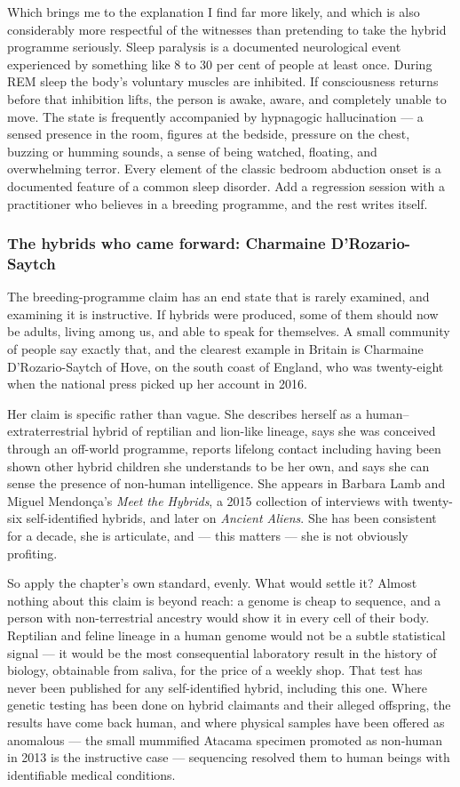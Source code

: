 Which brings me to the explanation I find far more likely, and which is also considerably more
respectful of the witnesses than pretending to take the hybrid programme seriously. Sleep
paralysis is a documented neurological event experienced by something like 8 to 30 per cent of
people at least once. During REM sleep the body's voluntary muscles are inhibited. If
consciousness returns before that inhibition lifts, the person is awake, aware, and completely
unable to move. The state is frequently accompanied by hypnagogic hallucination --- a sensed
presence in the room, figures at the bedside, pressure on the chest, buzzing or humming
sounds, a sense of being watched, floating, and overwhelming terror. Every element of the
classic bedroom abduction onset is a documented feature of a common sleep disorder. Add a
regression session with a practitioner who believes in a breeding programme, and the rest
writes itself.

\subsubsection*{The hybrids who came forward: Charmaine D'Rozario-Saytch}

The breeding-programme claim has an end state that is rarely examined, and examining it is
instructive. If hybrids were produced, some of them should now be adults, living among us, and
able to speak for themselves. A small community of people say exactly that, and the clearest
example in Britain is Charmaine D'Rozario-Saytch of Hove, on the south coast of England, who was
twenty-eight when the national press picked up her account in 2016.

Her claim is specific rather than vague. She describes herself as a human--extraterrestrial
hybrid of reptilian and lion-like lineage, says she was conceived through an off-world programme,
reports lifelong contact including having been shown other hybrid children she understands to be
her own, and says she can sense the presence of non-human intelligence. She appears in Barbara
Lamb and Miguel Mendon\c{c}a's \emph{Meet the Hybrids}, a 2015 collection of interviews with
twenty-six self-identified hybrids, and later on \emph{Ancient Aliens}. She has been consistent
for a decade, she is articulate, and --- this matters --- she is not obviously profiting.

So apply the chapter's own standard, evenly. What would settle it? Almost nothing about this
claim is beyond reach: a genome is cheap to sequence, and a person with non-terrestrial ancestry
would show it in every cell of their body. Reptilian and feline lineage in a human genome would
not be a subtle statistical signal --- it would be the most consequential laboratory result in
the history of biology, obtainable from saliva, for the price of a weekly shop. That test has
never been published for any self-identified hybrid, including this one. Where genetic testing
has been done on hybrid claimants and their alleged offspring, the results have come back human,
and where physical samples have been offered as anomalous --- the small mummified Atacama
specimen promoted as non-human in 2013 is the instructive case --- sequencing resolved them to
human beings with identifiable medical conditions.

